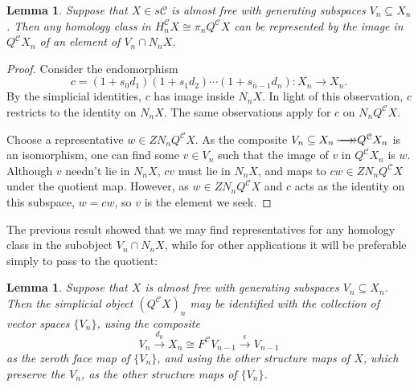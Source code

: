 \documentclass[11pt]{amsart}
\theoremstyle{plain}
\newtheorem{lem}[thm]{Lemma}
\theoremstyle{definition}
\renewcommand{\to}{\longrightarrow}
\newcommand{\calC}{\mathcal{C}}
\newcommand{\calc}{\mathcal{C}}
\theoremstyle{plain}
\newcommand{\epi}{{\,\makebox[0cm][l]{\ensuremath\to}\to}}
\begin{document}
\begin{Conventions and notation}
\begin{lem}\label{lemma on homology class repd by normalized generator}
Suppose that $X\in s\calC$ is almost free with generating subspaces $V_n\subseteq X_n$. Then any homology class in $H_n^{\calC}X\cong \pi_nQ^{\calC}X$ can be represented by the image in $Q^{\calC}X_n$ of an element of $V_n\cap N_nX$.
\end{lem}
\begin{proof}
Consider the endomorphism
\[c=(1+s_0d_1)(1+s_1d_2)\cdots (1+s_{n-1}d_n):X_n\to X_n.\]
By the simplicial identities, $c$ has image inside $N_n X$. In light of this observation, $c$ restricts to the identity on $N_nX$. The same observations apply for $c$ on  $N_nQ^\calC X$. 

Choose a representative $w\in ZN_nQ^\calC X$. As the composite $V_n\subseteq X_n\epi Q^\calC X_n$ is an isomorphism, one can find some $v\in V_n$ such that the image of $v$ in $Q^\calC X_n$ is $w$. Although $v$ needn't lie in $N_nX$, $cv$ must lie in $N_nX$, and maps to $cw\in ZN_nQ^\calC X$ under the quotient map.  However, as $w\in ZN_nQ^\calC X$ and $c$ acts as the identity on this subspace, $w=cw$, so $v$ is the element we seek.
\end{proof}
The previous result showed that we may find representatives for any homology class in the subobject $V_n\cap N_nX$, while for other applications it will be preferable simply to pass to the quotient: %
\begin{lem}\label{identify almost free indecs with gens}
Suppose that $X$ is almost free with generating subspaces $V_n\subseteq X_n$. Then the simplicial object $(Q^{\calc}X)_{n}$ may be identified with the collection of vector spaces $\{V_n\}$, using  the composite
\[V_{n}\overset{d_0}{\to}X_n\cong F^{\calc}V_{n-1}\overset{\epsilon}{\to}V_{n-1}\]
as the zeroth face map of $\{V_n\}$, and using the other structure maps of $X$, which preserve the $V_{n}$, as the other structure maps of $\{V_n\}$.
\end{lem}




\end{Conventions and notation}
\end{document}
